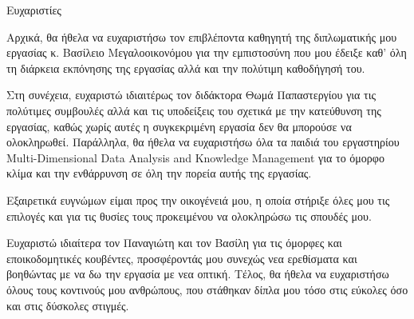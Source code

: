 \begin{center}
{\LARGE Ευχαριστίες}\\[1cm]
\end{center}

Αρχικά, θα ήθελα να ευχαριστήσω τον επιβλέποντα καθηγητή της διπλωματικής μου εργασίας κ. Βασίλειο Μεγαλοοικονόμου για την εμπιστοσύνη που μου έδειξε καθ' όλη τη διάρκεια εκπόνησης της εργασίας αλλά και την πολύτιμη καθοδήγησή του. 

\medskip
Στη συνέχεια, ευχαριστώ ιδιαιτέρως τον διδάκτορα Θωμά Παπαστεργίου για τις πολύτιμες συμβουλές αλλά και τις υποδείξεις του σχετικά με την κατεύθυνση της εργασίας, καθώς χωρίς αυτές η συγκεκριμένη εργασία δεν θα μπορούσε να ολοκληρωθεί. Παράλληλα, θα ήθελα να ευχαριστήσω όλα τα παιδιά του εργαστηρίου Multi-Dimensional Data Analysis and Knowledge Management για το όμορφο κλίμα και την ενθάρρυνση σε όλη την πορεία αυτής της εργασίας.

\medskip
Εξαιρετικά ευγνώμων είμαι προς την οικογένειά μου, η οποία στήριξε όλες μου τις επιλογές και για τις θυσίες τους προκειμένου να ολοκληρώσω τις σπουδές μου.

\medskip
Ευχαριστώ ιδιαίτερα τον Παναγιώτη και τον Βασίλη για τις όμορφες και εποικοδομητικές κουβέντες, προσφέροντάς μου συνεχώς νεα ερεθίσματα και βοηθώντας με να δω την εργασία με νεα οπτική. Τέλος, θα ήθελα να ευχαριστήσω όλους τους κοντινούς μου ανθρώπους, που στάθηκαν δίπλα μου τόσο στις εύκολες όσο και στις δύσκολες στιγμές. 